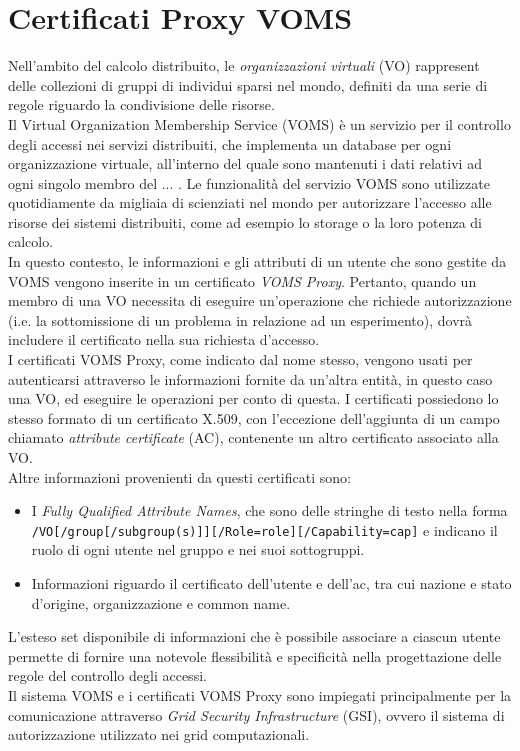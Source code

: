 \section{Certificati Proxy VOMS}
Nell'ambito del calcolo distribuito, le \textit{organizzazioni virtuali} (VO) rappresent delle collezioni di gruppi 
di individui sparsi nel mondo, definiti da una serie di regole riguardo la condivisione delle risorse. 
\\Il Virtual Organization Membership Service (VOMS) è un servizio per il controllo degli accessi 
nei servizi distribuiti, che implementa
un database per ogni organizzazione virtuale, all'interno del
quale sono mantenuti i dati relativi ad ogni singolo membro del ... . Le funzionalità del servizio VOMS sono utilizzate quotidiamente da 
migliaia di scienziati nel mondo per autorizzare l'accesso alle risorse dei sistemi distribuiti, come ad esempio lo storage o la
loro potenza di calcolo. 
\\ In questo contesto, le informazioni e gli attributi di un utente che sono gestite da VOMS vengono inserite in un certificato \textit{VOMS Proxy}.
Pertanto, quando un membro di una VO necessita di eseguire un'operazione che richiede autorizzazione (i.e. la sottomissione di un problema in relazione ad un esperimento), 
dovrà includere il certificato nella sua richiesta d'accesso. 
\\ I certificati VOMS Proxy, come indicato dal nome stesso, vengono usati per autenticarsi attraverso le informazioni fornite da un'altra entità, in questo caso una VO, ed eseguire le operazioni
per conto di questa. I certificati possiedono lo stesso formato di un certificato X.509, con l'eccezione dell'aggiunta di un campo chiamato \textit{attribute certificate} (AC),
 contenente un altro certificato associato alla VO. 
\\ Altre informazioni provenienti da questi certificati sono:
\begin{itemize}
    \item I \textit{Fully Qualified Attribute Names}, che sono delle stringhe di testo nella 
    forma \texttt{/VO[/group[/subgroup(s)]][/Role=role][/Capability=cap]} e indicano il ruolo di ogni utente nel gruppo e nei suoi sottogruppi. 
    \item Informazioni riguardo il certificato dell'utente e dell'ac, tra cui nazione e stato d'origine, organizzazione e common name.   
\end{itemize}
L'esteso set disponibile di informazioni che è possibile associare a ciascun utente permette di fornire
 una notevole flessibilità e specificità nella progettazione delle regole del controllo degli accessi. 
 \\ Il sistema VOMS e i certificati VOMS Proxy sono impiegati principalmente per la comunicazione attraverso \textit{Grid Security Infrastructure} (GSI), ovvero 
il sistema di autorizzazione utilizzato nei grid computazionali. 

